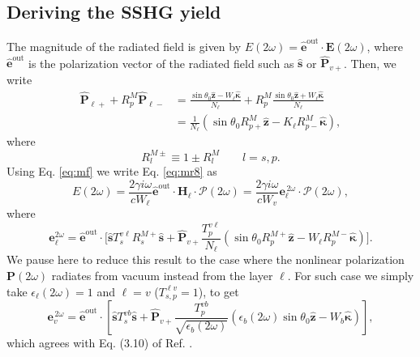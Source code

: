 
\subsection{Deriving the SSHG yield}

The magnitude of the radiated field is given by $E(2\omega) =
\hat{\mathbf{e}}^{\mathrm{out}}\cdot\mathbf{E}(2\omega)$, where
$\hat{\mathbf{e}}^{\mathrm{out}}$ is the polarization vector of the radiated
field such as $\hat{\mathbf{s}}$ or $\hat{\mathbf{P}}_{v+}$. Then, we write
\begin{equation}
\begin{split}
\hat{\mathbf{P}}_{\ell +} + R^{M}_{p}\hat{\mathbf{P}}_{\ell -}
&= \frac{\sin\theta_{0}\hat{\mathbf{z}} - W_{\ell}\hat{\boldsymbol{\kappa}}}
        {N_{\ell}}
 + R^{M}_{p}
   \frac{\sin\theta_{0}\hat{\mathbf{z}} + W_{\ell}\hat{\boldsymbol{\kappa}}}
        {N_{\ell}}\\
&= \frac{1}{N_{\ell}}
\left(
\sin\theta_{0}R^{M}_{p+}\hat{\mathbf{z}}
- K_{\ell}R^{M}_{p-}\hat{\boldsymbol{\kappa}}
\right),
\end{split}
\end{equation}
where
\begin{equation}\label{eq:rm}
R^{M\pm}_{l}\equiv 1 \pm R^{M}_{l} \qquad l=s,p.
\end{equation}
Using Eq. \eqref{eq:mf} we write Eq. \eqref{eq:mr8} as
\begin{equation}\label{eq:r10}
E(2\omega) = \frac{2\gamma i\omega}{cW_\ell}
\hat{\mathbf{e}}^{\mathrm{out}}\cdot\mathbf{H}_{\ell}\cdot
\boldsymbol{\mathcal{P}}(2\omega) 
= \frac{2\gamma i \omega}{cW_{v}}
\mathbf{e}^{\,2\omega}_{\ell}\cdot\boldsymbol{\mathcal{P}}(2\omega),
\end{equation}
where
\begin{equation}\label{eq:r12mm}
\mathbf{e}^{2\omega}_{\ell} =\hat{\mathbf{e}}^{\mathrm{out}}\cdot 
\Bigg[
\hat{\mathbf{s}}T_{s}^{v\ell}R^{M+}_{s}\hat{\mathbf{s}} + 
\hat{\mathbf{P}}_{v+}
\frac{T^{v\ell}_{p}}
     {N_{\ell}}
\left(
\sin\theta_{0}R^{M+}_{p}\hat{\mathbf{z}}
- W_{\ell}R^{M-}_{p}\hat{\boldsymbol{\kappa}}
\right) 
\Bigg]. 
\end{equation}  
We pause here to reduce this result to the case where the nonlinear polarization
$\mathbf{P}(2\omega)$ radiates from vacuum instead from the layer $\ell$. For
such case we simply take $\epsilon_{\ell}(2\omega) = 1$ and $\ell = v$ ($T^{\ell
v}_{s,p} = 1$), to get
\begin{equation}\label{eq:r13}
\mathbf{e}^{\,2\omega}_{v} = \hat{\mathbf{e}}^{\mathrm{out}}\cdot
\left[
\hat{\mathbf{s}}T_{s}^{v b}\hat{\mathbf{s}} + \hat{\mathbf{P}}_{v+}
\frac{T^{v b}_{p}}{\sqrt{\epsilon_{b}(2\omega)}}
\left(
  \epsilon_{b}(2\omega)\sin\theta_{0}\hat{\mathbf{z}}
- W_{b}\hat{\boldsymbol{\kappa}}
\right) 
\right],
\end{equation}
which agrees with Eq. (3.10) of Ref. \cite{mizrahiJOSA88}.

